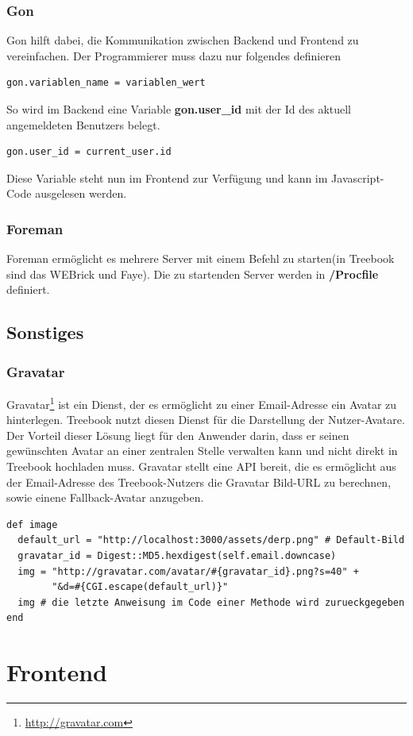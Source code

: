 \documentclass[10pt,a4paper]{book}
\begin{document}
\subsection{Gon}
Gon hilft dabei, die Kommunikation zwischen Backend und Frontend zu vereinfachen. Der Programmierer muss dazu nur folgendes definieren
\begin{lstlisting}
gon.variablen_name = variablen_wert
\end{lstlisting}
So wird im Backend eine Variable \textbf{gon.user\_id} mit der Id des aktuell angemeldeten Benutzers belegt.
\begin{lstlisting}
gon.user_id = current_user.id
\end{lstlisting}
Diese Variable steht nun im Frontend zur Verfügung und kann im Javascript-Code ausgelesen werden.
\subsection{Foreman}
Foreman ermöglicht es mehrere Server mit einem Befehl zu starten(in Treebook sind das WEBrick und Faye). Die zu startenden Server werden in \textbf{/Procfile} definiert.
\section{Sonstiges}
\subsection{Gravatar}
Gravatar\footnote{\href{http://gravatar.com}{http://gravatar.com}} ist ein Dienst, der es ermöglicht zu einer Email-Adresse ein Avatar zu hinterlegen. Treebook nutzt diesen Dienst für die Darstellung der Nutzer-Avatare. Der Vorteil dieser Lösung liegt für den Anwender darin, dass er seinen gewünschten Avatar an einer zentralen Stelle verwalten kann und nicht direkt in Treebook hochladen muss. Gravatar stellt eine API bereit, die es ermöglicht aus der Email-Adresse des Treebook-Nutzers die Gravatar Bild-URL zu berechnen, sowie einene Fallback-Avatar anzugeben.
\begin{lstlisting}
def image
  default_url = "http://localhost:3000/assets/derp.png" # Default-Bild
  gravatar_id = Digest::MD5.hexdigest(self.email.downcase)
  img = "http://gravatar.com/avatar/#{gravatar_id}.png?s=40" +
        "&d=#{CGI.escape(default_url)}"
  img # die letzte Anweisung im Code einer Methode wird zurueckgegeben
end
\end{lstlisting}
\chapter{Frontend}
\end{document}
